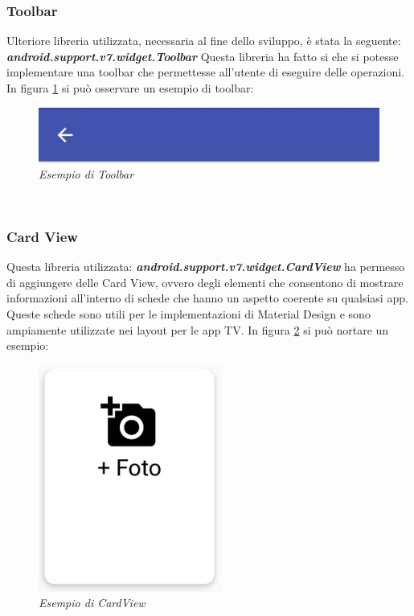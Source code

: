 \subsubsection{Toolbar}
Ulteriore libreria utilizzata, necessaria al fine dello sviluppo, è stata la seguente: \textit{\textbf{android.support.v7.widget.Toolbar}}
Questa libreria ha fatto si che si potesse implementare una toolbar che permettesse all'utente di eseguire delle operazioni.
In figura \ref{fig:toolbar} si può osservare un esempio di toolbar:\\
\begin{figure}[!h]
    \centering
	\includegraphics{Tesi/images/Toolbar}
	\caption{\textit{Esempio di Toolbar}}
	\label{fig:toolbar}
\end{figure}\\
\subsubsection{Card View}
Questa libreria utilizzata: 
\textit{\textbf{android.support.v7.widget.CardView}} ha permesso di aggiungere delle Card View, ovvero degli elementi che consentono di mostrare informazioni all'interno di schede che hanno un aspetto coerente su qualsiasi app. 
\\Queste schede sono utili per le implementazioni di Material Design e sono ampiamente utilizzate nei layout per le app TV.
In figura \ref{fig:cardview} si può nortare un esempio:
\begin{figure}[!h]
    \centering
	\includegraphics[scale=0.75]{Tesi/images/CardView}
	\caption{\textit{Esempio di CardView}}
	\label{fig:cardview}
\end{figure}
